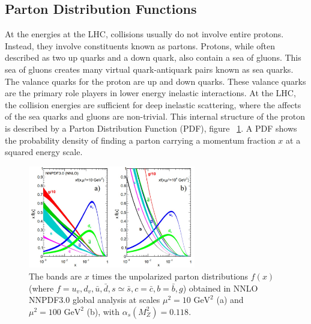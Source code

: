 \subsection{Parton Distribution Functions}
\indent At the energies at the LHC, collisions usually do not involve entire protons. Instead, they involve constituents known as partons. Protons, while often described as two up quarks and a down quark, also contain a sea of gluons. This sea of gluons creates many virtual quark-antiquark pairs known as sea quarks. The valance quarks for the proton are up and down quarks. These valance quarks are the primary role players in lower energy inelastic interactions. At the LHC, the collision energies are sufficient for deep inelastic scattering, where the affects of the sea quarks and gluons are non-trivial. 
This internal structure of the proton is described  by a Parton Distribution Function (PDF), figure ~\ref{fig:pdf}. A PDF shows the probability density of finding a parton carrying a momentum fraction ${x}$ at a squared energy scale. %
\newline

\begin{figure}[h]
\begin{center}
\includegraphics*[width=0.65\textwidth] {figures/pdf.jpg}
\caption[Parton distribution function]{The bands are ${x}$ times the unpolarized parton distributions
${f(x)}$ (where ${f = u_{v}, d_{v}, \bar{u}, \bar{d}, s \simeq{} \bar{s}, c = \bar{c}, b = \bar{b}, g}$) obtained in NNLO NNPDF3.0
global analysis at scales ${\mu^{2} = 10  \text{ GeV}^{2}}$
(a) and ${\mu^{2} = 100  \text{ GeV}^{2}}$ (b), with
${\alpha_{s}(M^{2}_{Z}) = 0.118}$.}
\label{fig:pdf}
\end{center}
\end{figure}

